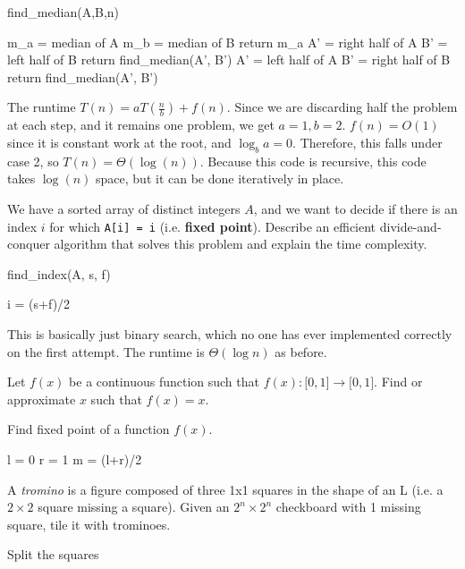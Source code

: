 \documentclass[11pt]{article}
\begin{document}
\begin{algorithm}[H]
\caption{find\_median(A,B,n)}
m\_a = median of A\;
m\_b = median of B\;
{
    return m\_a\;
}
{
    A' = right half of A\;
    B' = left half of B\;
    return find\_median(A', B')\;
}
{
    A' = left half of A\;
    B' = right half of B\;
    return find\_median(A', B')\;
}
\end{algorithm}
The runtime $T(n) = aT(\frac{n}{b}) + f(n)$. Since we are discarding half the problem at each step, and it remains one problem, we get $a = 1, b = 2$. $f(n) = O(1)$ since it is constant work at the root, and $\log_b{a} = 0$. Therefore, this falls under case 2, so $T(n) = \Theta(\log(n))$. Because this code is recursive, this code takes $\log(n)$ space, but it can be done iteratively in place.

\begin{exmp}
We have a sorted array of distinct integers $A$, and we want to decide if there is an index $i$ for which \texttt{A[i] = i} (i.e. \textbf{fixed point}). Describe an efficient divide-and-conquer algorithm that solves this problem and explain the time complexity.
\end{exmp}
\begin{algorithm}
\caption{find\_index(A, s, f)}
i = (s+f)/2\;
\end{algorithm}
This is basically just binary search, which no one has ever implemented correctly on the first attempt. The runtime is $\Theta(\log n)$ as before.
\begin{exmp}
Let $f(x)$ be a continuous function such that $f(x): \lbrack 0, 1 \rbrack \rightarrow \lbrack 0, 1\rbrack$. Find or approximate $x$ such that $f(x) = x$.
\end{exmp}
\begin{algorithm}
\caption{Find fixed point of a function $f(x)$.}
l = 0\;
r = 1\;
{
    m = (l+r)/2\;
}
\end{algorithm}
\begin{exmp}
A \textit{tromino} is a figure composed of three 1x1 squares in the shape of an L (i.e. a $2 \times 2$ square missing a square). Given an $2^n \times 2^n$ checkboard with 1 missing square, tile it with trominoes. 
\end{exmp}
Split the squares
\end{document}
